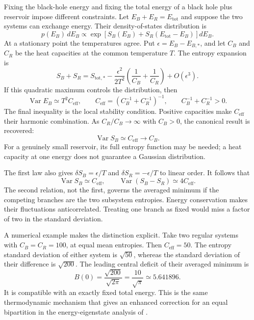 \documentclass[11pt,letterpaper]{article}
\theoremstyle{plain}
\theoremstyle{definition}
\theoremstyle{remark}
\begin{document}
Fixing the black-hole energy and fixing the total energy of a black hole plus
reservoir impose different constraints. Let
$E_B+E_R=E_{\mathrm{tot}}$ and suppose the two systems can exchange energy.
Their density-of-states distribution is
\begin{equation}
 p(E_B)\,dE_B\propto
 \exp\!\left[S_B(E_B)+S_R(E_{\mathrm{tot}}-E_B)\right]dE_B.
 \label{eq09:finite_bath}
\end{equation}
At a stationary point the temperatures agree. Put
$\epsilon=E_B-E_{B,*}$, and let $C_B$ and $C_R$ be the heat capacities at
the common temperature $T$. The entropy expansion is
\begin{equation}
 S_B+S_R=S_{\mathrm{tot},*}
 -\frac{\epsilon^2}{2T^2}
       \left(\frac1{C_B}+\frac1{C_R}\right)+O(\epsilon^3).
 \label{eq09:bath_hessian}
\end{equation}
If this quadratic maximum controls the distribution, then
\begin{equation}
 \operatorname{Var}E_B\simeq T^2C_{\mathrm{eff}},\qquad
 C_{\mathrm{eff}}=\left(C_B^{-1}+C_R^{-1}\right)^{-1},
 \qquad C_B^{-1}+C_R^{-1}>0.
 \label{eq09:sigma_micro}
\end{equation}
The final inequality is the local stability condition. Positive capacities
make $C_{\mathrm{eff}}$ their harmonic combination. As $C_R/C_B\to\infty$
with $C_B>0$, the canonical result is recovered:
\begin{equation}
 \operatorname{Var}S_B\simeq C_{\mathrm{eff}}\longrightarrow C_B.
 \label{eq09:sigma_canonical}
\end{equation}
For a genuinely small reservoir, its full entropy function may be needed;
a heat capacity at one energy does not guarantee a Gaussian distribution.

The first law also gives
$\delta S_B=\epsilon/T$ and $\delta S_R=-\epsilon/T$ to linear order.
It follows that
\begin{equation}
 \operatorname{Var}S_B\simeq C_{\mathrm{eff}},\qquad
 \operatorname{Var}(S_B-S_R)\simeq4C_{\mathrm{eff}}.
 \label{eq09:bath_gap_variance}
\end{equation}
The second relation, not the first, governs the averaged minimum if the
competing branches are the two subsystem entropies. Energy conservation makes
their fluctuations anticorrelated. Treating one branch as fixed would miss a
factor of two in the standard deviation.

A numerical example makes the distinction explicit. Take two regular systems
with $C_B=C_R=100$, at equal mean entropies. Then $C_{\mathrm{eff}}=50$.
The entropy standard deviation of either system is $\sqrt{50}$, whereas
the standard deviation of their difference is $\sqrt{200}$. The leading
central deficit of their averaged minimum is
\begin{equation}
 B(0)=\frac{\sqrt{200}}{\sqrt{2\pi}}
     =\frac{10}{\sqrt{\pi}}\simeq5.641896.
 \label{eq09:bath_example}
\end{equation}
It is compatible with an exactly fixed total energy. This is the same
thermodynamic mechanism that gives an enhanced correction for an equal
bipartition in the energy-eigenstate analysis of
\citet{murthysrednicki2019}.
\end{document}
